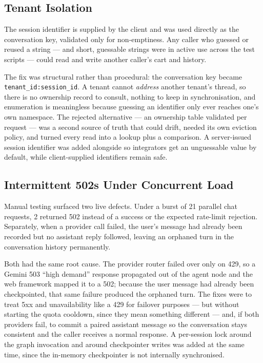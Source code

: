 \documentclass[11pt,a4paper]{article}
\newcommand{\code}[1]{\texttt{\small #1}}
\begin{document}
\subsection{Tenant Isolation}
\label{sec:tenant}

The session identifier is supplied by the client and was used directly as the
conversation key, validated only for non-emptiness. Any caller who guessed or
reused a string --- and short, guessable strings were in active use across the
test scripts --- could read and write another caller's cart and history.

The fix was structural rather than procedural: the conversation key became
\code{tenant\_id:\allowbreak session\_id}. A tenant cannot \emph{address} another tenant's
thread, so there is no ownership record to consult, nothing to keep in
synchronisation, and enumeration is meaningless because guessing an identifier
only ever reaches one's own namespace. The rejected alternative --- an
ownership table validated per request --- was a second source of truth that
could drift, needed its own eviction policy, and turned every read into a
lookup plus a comparison. A server-issued session identifier was added
alongside so integrators get an unguessable value by default, while
client-supplied identifiers remain safe.

\subsection{Intermittent 502s Under Concurrent Load}

Manual testing surfaced two live defects. Under a burst of 21 parallel chat
requests, 2 returned 502 instead of a success or the expected rate-limit
rejection. Separately, when a provider call failed, the user's message had
already been recorded but no assistant reply followed, leaving an orphaned
turn in the conversation history permanently.

Both had the same root cause. The provider router failed over only on 429, so
a Gemini 503 ``high demand'' response propagated out of the agent node and the
web framework mapped it to a 502; because the user message had already been
checkpointed, that same failure produced the orphaned turn. The fixes were to
treat 5xx and unavailability like a 429 for failover purposes --- but without
starting the quota cooldown, since they mean something different --- and, if
both providers fail, to commit a paired assistant message so the conversation
stays consistent and the caller receives a normal response. A per-session lock
around the graph invocation and around checkpointer writes was added at the
same time, since the in-memory checkpointer is not internally synchronised.
\end{document}
